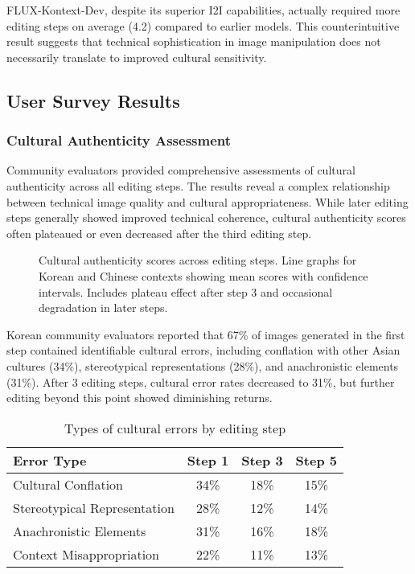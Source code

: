 \documentclass{article}
\begin{document}
FLUX-Kontext-Dev, despite its superior I2I capabilities, actually required more editing steps on average (4.2) compared to earlier models. This counterintuitive result suggests that technical sophistication in image manipulation does not necessarily translate to improved cultural sensitivity.

\subsection{User Survey Results}

\subsubsection{Cultural Authenticity Assessment}

Community evaluators provided comprehensive assessments of cultural authenticity across all editing steps. The results reveal a complex relationship between technical image quality and cultural appropriateness. While later editing steps generally showed improved technical coherence, cultural authenticity scores often plateaued or even decreased after the third editing step.

\begin{figure}[h]
  \centering
  \fbox{\rule[-.5cm]{0cm}{5cm} \rule[-.5cm]{12cm}{0cm}}
  \caption{Cultural authenticity scores across editing steps. Line graphs for Korean and Chinese contexts showing mean scores with confidence intervals. Includes plateau effect after step 3 and occasional degradation in later steps.}
  \label{fig:authenticity-scores}
\end{figure}

Korean community evaluators reported that 67\% of images generated in the first step contained identifiable cultural errors, including conflation with other Asian cultures (34\%), stereotypical representations (28\%), and anachronistic elements (31\%). After 3 editing steps, cultural error rates decreased to 31\%, but further editing beyond this point showed diminishing returns.

\begin{table}[h]
  \caption{Types of cultural errors by editing step}
  \label{table:error-types}
  \centering
  \begin{tabular}{lccc}
    \toprule
    Error Type & Step 1 & Step 3 & Step 5 \\
    \midrule
    Cultural Conflation & 34\% & 18\% & 15\% \\
    Stereotypical Representation & 28\% & 12\% & 14\% \\
    Anachronistic Elements & 31\% & 16\% & 18\% \\
    Context Misappropriation & 22\% & 11\% & 13\% \\
    \bottomrule
  \end{tabular}
\end{table}
\end{document}

